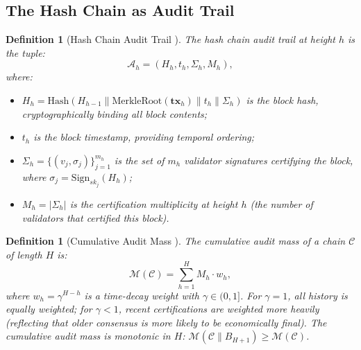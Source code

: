 \documentclass[11pt,a4paper]{article}
\newtheorem{definition}[theorem]{Definition}
\theoremstyle{definition}
\begin{document}
\subsection{The Hash Chain as Audit Trail}
\begin{definition}[Hash Chain Audit Trail ]
\label{def:hash_audit}
The hash chain audit trail at height $h$ is the tuple:
\begin{equation}
    \mathcal{A}_h = (H_h, t_h, \Sigma_h, M_h),
    \label{eq:audit_trail}
\end{equation}
where:
\begin{itemize}
    \item $H_h = \mathrm{Hash}(H_{h-1} \parallel \mathrm{MerkleRoot}(\mathbf{tx}_h) \parallel t_h \parallel \Sigma_h)$ is the block hash, cryptographically binding all block contents;
    \item $t_h$ is the block timestamp, providing temporal ordering;
    \item $\Sigma_h = \{(v_j, \sigma_j)\}_{j=1}^{m_h}$ is the set of $m_h$ validator signatures certifying the block, where $\sigma_j = \mathrm{Sign}_{sk_j}(H_h)$;
    \item $M_h = |\Sigma_h|$ is the certification multiplicity at height $h$ (the number of validators that certified this block).
\end{itemize}
\end{definition}
\begin{definition}[Cumulative Audit Mass ]
\label{def:cumulative_audit_mass}
The cumulative audit mass of a chain $\mathcal{C}$ of length $H$ is:
\begin{equation}
    \mathcal{M}(\mathcal{C}) = \sum_{h=1}^{H} M_h \cdot w_h,
    \label{eq:cumulative_audit_mass}
\end{equation}
where $w_h = \gamma^{H-h}$ is a time-decay weight with $\gamma \in (0, 1]$. For $\gamma = 1$, all history is equally weighted; for $\gamma < 1$, recent certifications are weighted more heavily (reflecting that older consensus is more likely to be economically final). The cumulative audit mass is monotonic in $H$: $\mathcal{M}(\mathcal{C} \parallel B_{H+1}) \geq \mathcal{M}(\mathcal{C})$.
\end{definition}
\end{document}
